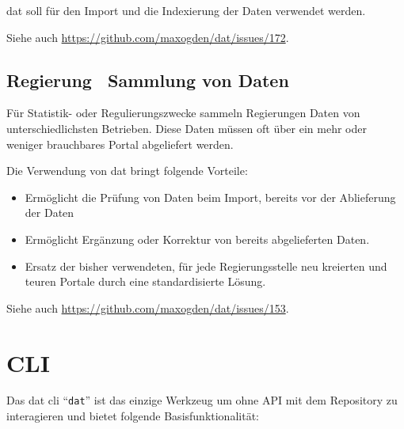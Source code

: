 dat soll für den Import und die Indexierung der Daten verwendet werden.

Siehe auch \url{https://github.com/maxogden/dat/issues/172}.

\subsection{Regierung \textendash\ Sammlung von Daten} %
Für Statistik- oder Regulierungszwecke sammeln Regierungen Daten von unterschiedlichsten Betrieben. Diese Daten müssen oft über ein mehr oder weniger brauchbares Portal abgeliefert werden.

Die Verwendung von \gls{dat} bringt folgende Vorteile:
\begin{itemize}
\item Ermöglicht die Prüfung von Daten beim Import, bereits vor der Ablieferung der Daten
\item Ermöglicht Ergänzung oder Korrektur von bereits abgelieferten Daten.
\item Ersatz der bisher verwendeten, für jede Regierungsstelle neu kreierten und teuren Portale durch eine standardisierte Lösung.
\end{itemize}

Siehe auch \url{https://github.com/maxogden/dat/issues/153}.

\section{CLI}


Das \gls{dat} \gls{cli} ``\texttt{dat}'' ist das einzige Werkzeug um ohne API mit dem Repository zu interagieren und bietet folgende Basisfunktionalität:


